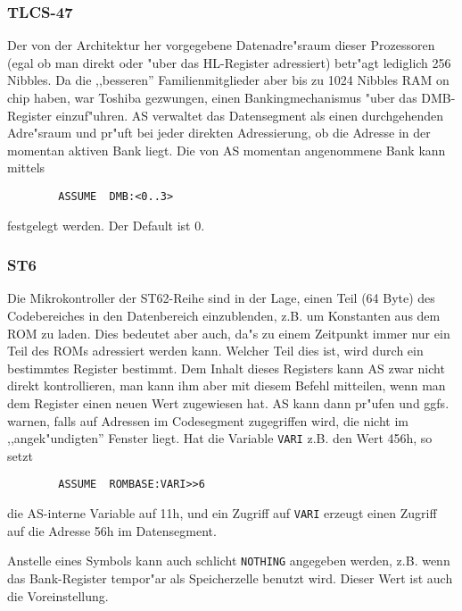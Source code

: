 \documentclass[12pt,a4paper,twoside]{report}
\newcommand{\tty}[1]{{\tt #1}}
\begin{document}
{%

\subsubsection{TLCS-47}

Der von der Architektur her vorgegebene Datenadre"sraum dieser
Prozessoren (egal ob man direkt oder "uber das HL-Register adressiert)
betr"agt lediglich 256 Nibbles.  Da die ,,besseren'' Familienmitglieder
aber bis zu 1024 Nibbles RAM on chip haben, war Toshiba gezwungen, einen
Bankingmechanismus "uber das DMB-Register einzuf"uhren.  AS verwaltet
das Datensegment als einen durchgehenden Adre"sraum und pr"uft bei jeder
direkten Adressierung, ob die Adresse in der momentan aktiven Bank
liegt.  Die von AS momentan angenommene Bank kann mittels
\begin{verbatim}
        ASSUME  DMB:<0..3>
\end{verbatim}
festgelegt werden.  Der Default ist 0.


\subsubsection{ST6}
\label{ST6Assume}

Die Mikrokontroller der ST62-Reihe sind in der Lage, einen Teil (64 Byte)
des Codebereiches in den Datenbereich einzublenden, z.B. um Konstanten aus
dem ROM zu laden.  Dies bedeutet aber auch, da"s zu einem Zeitpunkt immer
nur ein Teil des ROMs adressiert werden kann.  Welcher Teil dies ist, wird
durch ein bestimmtes Register bestimmt.  Dem Inhalt dieses Registers kann
AS zwar nicht direkt kontrollieren, man kann ihm aber mit diesem Befehl
mitteilen, wenn man dem Register einen neuen Wert zugewiesen hat.  AS kann
dann pr"ufen und ggfs. warnen, falls auf Adressen im Codesegment
zugegriffen wird, die nicht im ,,angek"undigten'' Fenster liegt.
Hat die Variable \tty{VARI} z.B. den Wert 456h, so setzt
\begin{verbatim}
        ASSUME  ROMBASE:VARI>>6
\end{verbatim}
die AS-interne Variable auf 11h, und ein Zugriff auf \tty{VARI} erzeugt einen
Zugriff auf die Adresse 56h im Datensegment.

Anstelle eines Symbols kann auch schlicht \tty{NOTHING} angegeben
werden, z.B. wenn das Bank-Register tempor"ar als Speicherzelle benutzt
wird.  Dieser Wert ist auch die Voreinstellung.

}
\end{document}
